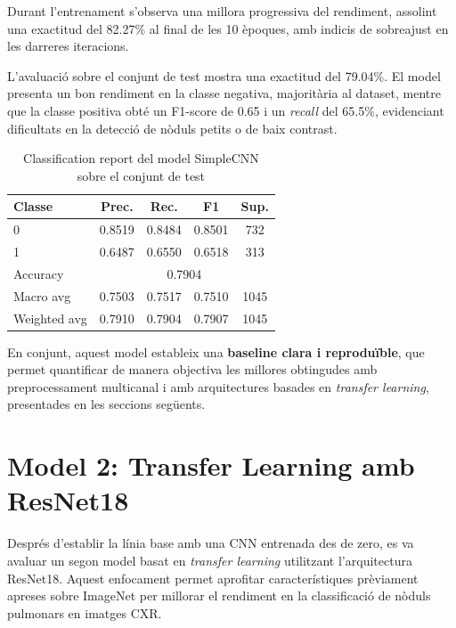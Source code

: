 \documentclass[conference]{IEEEtran}
\begin{document}
Durant l’entrenament s’observa una millora progressiva del rendiment, assolint una exactitud del 82.27\% al final de les 10 èpoques, amb indicis de sobreajust en les darreres iteracions.



L’avaluació sobre el conjunt de test mostra una exactitud del 79.04\%. El model presenta un bon rendiment en la classe negativa, majoritària al dataset, mentre que la classe positiva obté un F1-score de 0.65 i un \textit{recall} del 65.5\%, evidenciant dificultats en la detecció de nòduls petits o de baix contrast.

\begin{table}[H]
\caption{Classification report del model SimpleCNN sobre el conjunt de test}
\label{tab:classification_report_simplecnn}
\centering
\footnotesize
\setlength{\tabcolsep}{3pt}
\begin{tabular}{lcccc}
\toprule
\textbf{Classe} & \textbf{Prec.} & \textbf{Rec.} & \textbf{F1} & \textbf{Sup.} \\
\midrule
0 & 0.8519 & 0.8484 & 0.8501 & 732 \\
1 & 0.6487 & 0.6550 & 0.6518 & 313 \\
\midrule
Accuracy     & \multicolumn{4}{c}{0.7904} \\
Macro avg    & 0.7503 & 0.7517 & 0.7510 & 1045 \\
Weighted avg & 0.7910 & 0.7904 & 0.7907 & 1045 \\
\bottomrule
\end{tabular}
\end{table}

En conjunt, aquest model estableix una \textbf{baseline clara i reproduïble}, que permet quantificar de manera objectiva les millores obtingudes amb preprocessament multicanal i amb arquitectures basades en \textit{transfer learning}, presentades en les seccions següents.


\section{{ \textbf{Model 2: Transfer Learning amb ResNet18}}}
Després d’establir la línia base amb una CNN entrenada des de zero, es va avaluar un segon model basat en \textit{transfer learning} utilitzant l’arquitectura ResNet18. Aquest enfocament permet aprofitar característiques prèviament apreses sobre ImageNet per millorar el rendiment en la classificació de nòduls pulmonars en imatges CXR.
\end{document}
